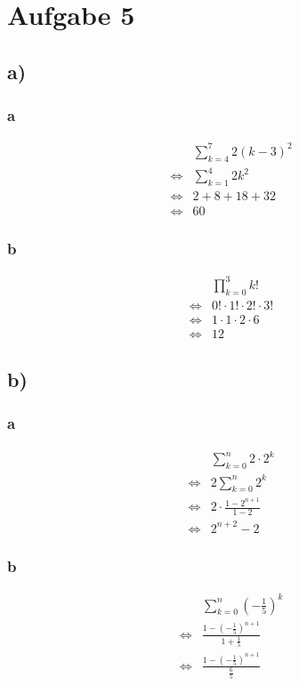 \documentclass[a4paper, 11pt]{article}
\begin{document}
\section{Aufgabe 5}
\label{sec:orgead7469}
\subsection{a)}
\label{sec:org87b63a3}
\subsubsection{a}
\label{sec:orgc298413}
\begin{align*}
    & \sum_{k = 4}^{7} 2(k - 3)^2 \\
    \Leftrightarrow & \sum_{k = 1}^{4} 2k^2 \\
    \Leftrightarrow & 2 + 8 + 18 + 32 \\
    \Leftrightarrow & 60
\end{align*}

\subsubsection{b}
\label{sec:org2dba92a}
\begin{align*}
    & \prod_{k = 0}^{3} k! \\
    \Leftrightarrow & 0! \cdot 1! \cdot 2! \cdot 3! \\
    \Leftrightarrow & 1 \cdot 1 \cdot 2 \cdot 6 \\
    \Leftrightarrow & 12
\end{align*}

\subsection{b)}
\label{sec:org00aeee4}
\subsubsection{a}
\label{sec:org24eb924}
\begin{align*}
    & \sum_{k = 0}^{n} 2 \cdot 2^k \\
    \Leftrightarrow & 2 \sum_{k = 0}^{n} 2^k \\
    \Leftrightarrow & 2 \cdot \frac{1 - 2^{n + 1}}{1 - 2} \\
    \Leftrightarrow & 2^{n + 2} - 2
\end{align*}

\subsubsection{b}
\label{sec:org75afc03}
\begin{align*}
    & \sum_{k = 0}^{n} (-\frac{1}{5})^k \\
    \Leftrightarrow & \frac{1 - (-\frac{1}{5})^{n + 1}}{1 + \frac{1}{5}} \\
    \Leftrightarrow & \frac{1 - (-\frac{1}{5})^{n + 1}}{\frac{6}{5}}
\end{align*}
\end{document}
